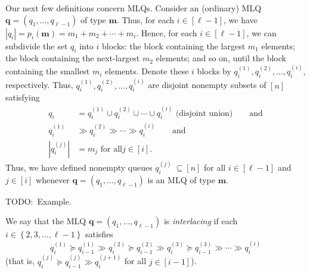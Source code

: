 \documentclass[reqno]{amsart}%
\newcommand{\0}{\phantom{c}}
\newcommand{\defn}[1]{{\color{darkred}\emph{#1}}}
\theoremstyle{plain}
\theoremstyle{definition}
\numberwithin{equation}{section}
\begin{document}
Our next few definitions concern MLQs. Consider an (ordinary) MLQ
$\mathbf{q}=\left(  q_{1},\ldots,q_{\ell-1}\right)  $ of type $\mathbf{m}$.
Thus, for each $i\in\left[  \ell-1\right]  $, we have $\left\vert
q_{i}\right\vert =p_{i}\left(  \mathbf{m}\right)  =m_{1}+m_{2}+\cdots+m_{i}$.
Hence, for each $i\in\left[  \ell-1\right]  $, we can subdivide the set
$q_{i}$ into $i$ blocks: the block containing the largest $m_{1}$ elements;
the block containing the next-largest $m_{2}$ elements; and so on, until the
block containing the smallest $m_{i}$ elements. Denote these $i$ blocks by
$q_{i}^{\left(  1\right)  },q_{i}^{\left(  2\right)  },\ldots,q_{i}^{\left(
i\right)  }$, respectively. Thus, $q_{i}^{\left(  1\right)  },q_{i}^{\left(
2\right)  },\ldots,q_{i}^{\left(  i\right)  }$ are disjoint nonempty subsets
of $\left[  n\right]  $ satisfying
\begin{align}
q_{i}  &  =q_{i}^{\left(  1\right)  }\cup q_{i}^{\left(  2\right)  }\cup
\cdots\cup q_{i}^{\left(  i\right)  }\text{ (disjoint union)}\qquad
\text{and}\label{eq.determinant_form.qij.1}\\
q_{i}^{\left(  1\right)  }  &  \gg q_{i}^{\left(  2\right)  }\gg\cdots\gg
q_{i}^{\left(  i\right)  }\qquad\text{and}\label{eq.determinant_form.qij.2}\\
\left\vert q_{i}^{\left(  j\right)  }\right\vert  &  =m_{j}\text{ for all
}j\in\left[  i\right]  . \label{eq.determinant_form.qij.3}%
\end{align}
Thus, we have defined nonempty queues
\defn{$q_{i}^{\left(j\right)}$}$\ \subseteq\left[  n\right]  $ for all
$i\in\left[  \ell-1\right]  $ and $j\in\left[  i\right]  $ whenever
$\mathbf{q}=\left(  q_{1},\ldots,q_{\ell-1}\right)  $ is an MLQ of type
$\mathbf{m}$.

TODO:\ Example.

We say that the MLQ $\mathbf{q}=\left(  q_{1},\ldots,q_{\ell-1}\right)  $ is
\defn{interlacing} if each $i\in\left\{  2,3,\ldots,\ell-1\right\}  $
satisfies%
\begin{equation}
q_{i}^{\left(  1\right)  }\succeq q_{i-1}^{\left(  1\right)  }\gg
q_{i}^{\left(  2\right)  }\succeq q_{i-1}^{\left(  2\right)  }\gg
q_{i}^{\left(  3\right)  }\succeq q_{i-1}^{\left(  3\right)  }\gg\cdots\gg
q_{i}^{\left(  i\right)  } \label{eq.determinant_form.interlacing.def}%
\end{equation}
(that is, $q_{i}^{\left(  j\right)  }\succeq q_{i-1}^{\left(  j\right)  }\gg
q_{i}^{\left(  j+1\right)  }$ for all $j\in\left[  i-1\right]  $).
\end{document}
